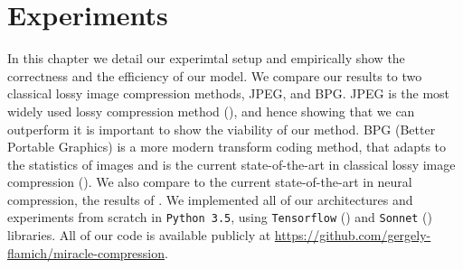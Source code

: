 
\chapter{Experiments}
\label{chapter:experiments}

\graphicspath{{../img/plots/vae_latents/}{../img/plots/kodak_comparison/}{../img/plots/kodak_coding_time/}{../img/plots/kodak_side_info/}{../img/plots/reconstructions/}}

\label{sec:experimental_results}
\par
In this chapter we detail our experimtal setup and empirically show the
correctness and the efficiency of our model. We compare our results to
two classical lossy image compression methods, JPEG, and BPG. JPEG is the most
widely used lossy compression method (\cite{bull2014communicating}), and hence
showing that we can outperform it is important to show the viability of our
method. BPG (Better Portable Graphics) is a more modern transform coding method,
that adapts to the statistics of images and is the current state-of-the-art in
classical lossy image compression (\cite{rippel2017real}).
We also compare to the current state-of-the-art in neural compression, the results of
\cite{balle2018variational}\footnotemark. We implemented all of our
architectures and experiments from scratch in \texttt{Python 3.5}, using \texttt{Tensorflow}
(\cite{tensorflow2015-whitepaper}) and \texttt{Sonnet} (\cite{sonnetblog})
libraries. All of our code is available publicly at
\url{https://github.com/gergely-flamich/miracle-compression}. 


